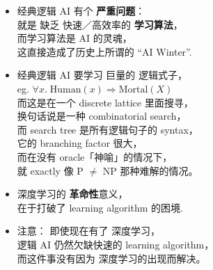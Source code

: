 \begin{itemize}
	\item 经典逻辑 AI 有个 \textbf{严重问题}： \\
		就是 缺乏 快速／高效率的 \textbf{学习算法}，\\
		而学习算法是 AI 的灵魂，\\
		这直接造成了历史上所谓的 ``AI Winter''.
	\item 经典逻辑 AI 要学习 巨量的 逻辑式子，\\
		eg. $\forall x. \; \mbox{Human}(x) \Rightarrow \mbox{Mortal}(X)$ \\
		而这是在一个 discrete lattice 里面搜寻，\\
		换句话说是一种 combinatorial search，\\
		而 search tree 是所有逻辑句子的 syntax，\\
		它的 branching factor 很大，\\
		而在没有 oracle「神喻」的情况下，\\
		就 exactly 像 P $\neq$ NP 那种难解的情况。
	\item 深度学习的 \textbf{革命性}意义，\\
		在于打破了 learning algorithm 的困境.
	\item 注意： 即使现在有了 深度学习，\\
		逻辑 AI 仍然欠缺快速的 learning algorithm，\\
		而这件事没有因为 深度学习的出现而解决。
\end{itemize}



